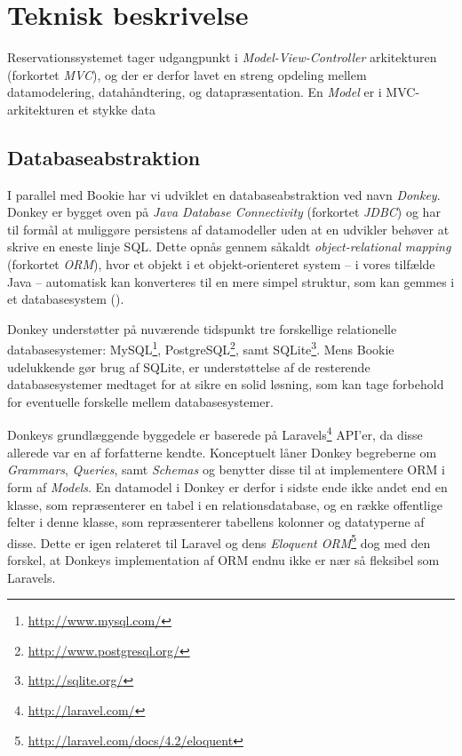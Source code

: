 \chapter{Teknisk beskrivelse}

Reservationssystemet tager udgangpunkt i \textit{Model-View-Controller} arkitekturen (forkortet \textit{MVC}), og der er derfor lavet en streng opdeling mellem datamodelering, datahåndtering, og datapræsentation. En \textit{Model} er i MVC-arkitekturen et stykke data

\section{Databaseabstraktion}

I parallel med Bookie har vi udviklet en databaseabstraktion ved navn \textit{Donkey}. Donkey er bygget oven på \textit{Java Database Connectivity} (forkortet \textit{JDBC}) og har til formål at muliggøre persistens af datamodeller uden at en udvikler behøver at skrive en eneste linje SQL. Dette opnås gennem såkaldt \textit{object-relational mapping} (forkortet \textit{ORM}), hvor et objekt i et objekt-orienteret system – i vores tilfælde Java – automatisk kan konverteres til en mere simpel struktur, som kan gemmes i et databasesystem (\cite{wiki:orm}).

Donkey understøtter på nuværende tidspunkt tre forskellige relationelle databasesystemer: MySQL\footnote{\url{http://www.mysql.com/}}, PostgreSQL\footnote{\url{http://www.postgresql.org/}}, samt SQLite\footnote{\url{http://sqlite.org/}}. Mens Bookie udelukkende gør brug af SQLite, er understøttelse af de resterende databasesystemer medtaget for at sikre en solid løsning, som kan tage forbehold for eventuelle forskelle mellem databasesystemer.

Donkeys grundlæggende byggedele er baserede på Laravels\footnote{\url{http://laravel.com/}} API'er, da disse allerede var en af forfatterne kendte. Konceptuelt låner Donkey begreberne om \textit{Grammars}, \textit{Queries}, samt \textit{Schemas} og benytter disse til at implementere ORM i form af \textit{Models}. En datamodel i Donkey er derfor i sidste ende ikke andet end en klasse, som repræsenterer en tabel i en relationsdatabase, og en række offentlige felter i denne klasse, som repræsenterer tabellens kolonner og datatyperne af disse. Dette er igen relateret til Laravel og dens \textit{Eloquent ORM}\footnote{\url{http://laravel.com/docs/4.2/eloquent}} dog med den forskel, at Donkeys implementation af ORM endnu ikke er nær så fleksibel som Laravels.

